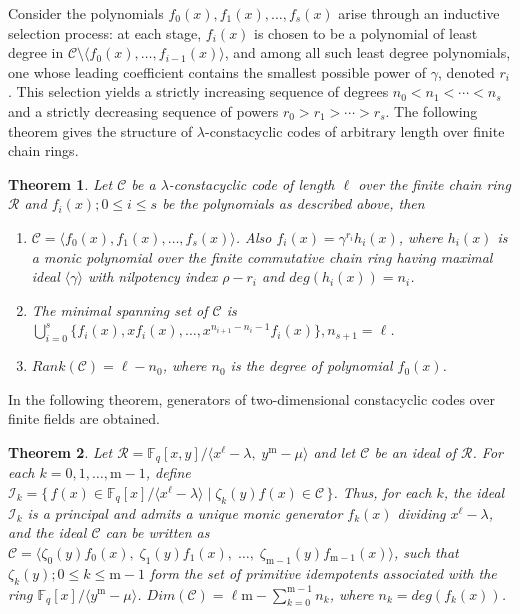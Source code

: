 \documentclass[12pt,a4paper]{article}
\newtheorem{theorem}{Theorem}[section]
\begin{document}
Consider the polynomials $f_0(x), f_1(x), \dots, f_s(x)$ arise through an inductive selection process: at each stage, $f_i(x)$ is chosen to be a polynomial of least degree in $\mathcal{C} \setminus \langle f_0(x), \dots, f_{i-1}(x) \rangle$, and among all such least degree polynomials, one whose leading coefficient contains the smallest possible power of $\gamma$, denoted $r_i$. This selection yields a strictly increasing sequence of degrees $n_0 < n_1 < \cdots < n_s$ and a strictly decreasing sequence of powers $r_0 > r_1 > \cdots > r_s$.
The following theorem gives the structure of $\lambda$-constacyclic codes of arbitrary length over finite chain rings.
\begin{theorem}\cite{singh2026structure}\label{thm:cyclicspanning}
    Let $\mathcal{C}$ be a $\lambda$-constacyclic code of length $\ell$ over the finite chain ring $\mathcal{R}$ and $f_i(x); 0 \le i \le s$ be the polynomials as described above, then
    \begin{enumerate}
        \item $\mathcal{C}= \langle f_0(x),f_1(x), \dots , f_s(x) \rangle$. Also $f_i(x)=\gamma^{r_i}h_i(x)$, where $h_i(x)$ is a monic polynomial over the finite commutative chain ring having maximal ideal $\langle \gamma \rangle$ with nilpotency index $\rho -r_i$ and $deg(h_i(x))=n_i$. 
        \item  The minimal spanning set of $\mathcal{C}$ is $\bigcup_{i=0}^{s}\{ f_i(x), xf_i(x), \ldots, x^{n_{i+1}-n_{i}-1}f_i(x)  \}, n_{s+1}=\ell$.
        \item $Rank(\mathcal{C})=\ell-n_0$, where $n_0$ is the degree of polynomial $f_0(x)$.
    \end{enumerate}
\end{theorem}
In the following theorem, generators of two-dimensional constacyclic codes over finite fields are obtained.

\begin{theorem}\label{thm:ccfield}
\cite{bhardwaj2022}    Let $\mathcal{R}=\mathbb{F}_q[x,y]/\langle x^{\ell}-\lambda,\; y^{\mathrm{m}}-\mu\rangle$ and let $\mathcal{C}$ be an ideal of $\mathcal{R}$. For each ${k}=0,1,\ldots,\mathrm{m}-1$, define $\mathcal{I}_{k}=\{\,f(x)\in \mathbb{F}_q[x]/\langle x^{\ell}-\lambda\rangle \mid \mathsf{\zeta}_{k}(y)f(x)\in \mathcal{C}\,\}$. Thus, for each ${k}$, the ideal $\mathcal{I}_{k}$ is a principal and admits a unique monic generator $f_{k}(x)$ dividing $x^{\ell}-\lambda$, and the ideal $\mathcal{C}$ can be written as $\mathcal{C}=\langle \zeta_0(y)f_0(x),\; \zeta_1(y)f_1(x),\; \ldots,\; \zeta_{\mathrm{m}-1}(y)f_{\mathrm{m}-1}(x)\rangle$, such that $\zeta_{k}(y) ; 0 \le {k} \le \mathrm{m}-1$ form the set of primitive idempotents associated with the ring $\mathbb{F}_q[x]/\langle y^{\mathrm{m}} - \mu \rangle$. $Dim(\mathcal{C})=\ell\mathrm{m}- \sum_{k=0}^{\mathrm{m}-1}n_k$, where $n_k=deg(f_k(x))$.
\end{theorem}
\end{document}
